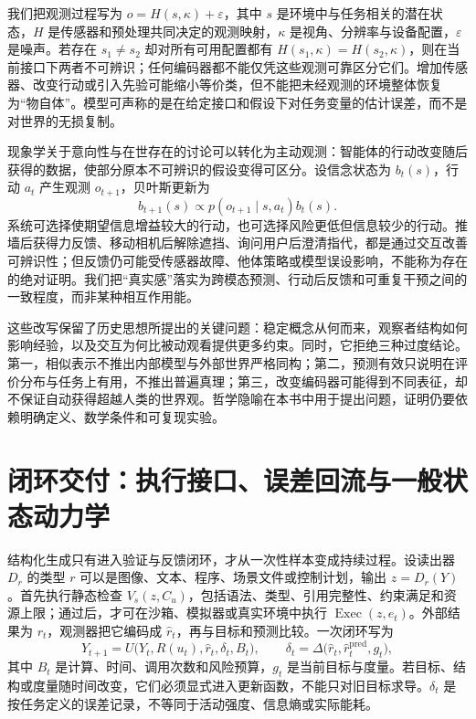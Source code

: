 我们把观测过程写为 $o=H(s,\kappa)+\varepsilon$，其中 $s$ 是环境中与任务相关的潜在状态，$H$ 是传感器和预处理共同决定的观测映射，$\kappa$ 是视角、分辨率与设备配置，$\varepsilon$ 是噪声。若存在 $s_1\ne s_2$ 却对所有可用配置都有 $H(s_1,\kappa)=H(s_2,\kappa)$，则在当前接口下两者不可辨识；任何编码器都不能仅凭这些观测可靠区分它们。增加传感器、改变行动或引入先验可能缩小等价类，但不能把未经观测的环境整体恢复为“物自体”。模型可声称的是在给定接口和假设下对任务变量的估计误差，而不是对世界的无损复制。

\label{sec:phenomenology}
现象学关于意向性与在世存在的讨论可以转化为主动观测：智能体的行动改变随后获得的数据，使部分原本不可辨识的假设变得可区分。设信念状态为 $b_t(s)$，行动 $a_t$ 产生观测 $o_{t+1}$，贝叶斯更新为
\begin{equation}
 b_{t+1}(s)\propto p(o_{t+1}\mid s,a_t)b_t(s).
\end{equation}
系统可选择使期望信息增益较大的行动，也可选择风险更低但信息较少的行动。推墙后获得力反馈、移动相机后解除遮挡、询问用户后澄清指代，都是通过交互改善可辨识性；但反馈仍可能受传感器故障、他体策略或模型误设影响，不能称为存在的绝对证明。我们把“真实感”落实为跨模态预测、行动后反馈和可重复干预之间的一致程度，而非某种相互作用能。

这些改写保留了历史思想所提出的关键问题：稳定概念从何而来，观察者结构如何影响经验，以及交互为何比被动观看提供更多约束。同时，它拒绝三种过度结论。第一，相似表示不推出内部模型与外部世界严格同构；第二，预测有效只说明在评价分布与任务上有用，不推出普遍真理；第三，改变编码器可能得到不同表征，却不保证自动获得超越人类的世界观。哲学隐喻在本书中用于提出问题，证明仍要依赖明确定义、数学条件和可复现实验。

\section{闭环交付：执行接口、误差回流与一般状态动力学}

结构化生成只有进入验证与反馈闭环，才从一次性样本变成持续过程。设读出器 $D_r$ 的类型 $r$ 可以是图像、文本、程序、场景文件或控制计划，输出 $z=D_r(Y)$。首先执行静态检查 $V_s(z,C_u)$，包括语法、类型、引用完整性、约束满足和资源上限；通过后，才可在沙箱、模拟器或真实环境中执行 $\operatorname{Exec}(z,e_t)$。外部结果为 $r_t$，观测器把它编码成 $\widehat r_t$，再与目标和预测比较。一次闭环写为
\begin{equation}
  Y_{t+1}=U\bigl(Y_t,R(u_t),\widehat r_t,\delta_t,B_t\bigr),
  \qquad \delta_t=\Delta\bigl(\widehat r_t,\widehat r_t^{\mathrm{pred}},g_t\bigr),
\end{equation}
其中 $B_t$ 是计算、时间、调用次数和风险预算，$g_t$ 是当前目标与度量。若目标、结构或度量随时间改变，它们必须显式进入更新函数，不能只对旧目标求导。$\delta_t$ 是按任务定义的误差记录，不等同于活动强度、信息熵或实际能耗。

